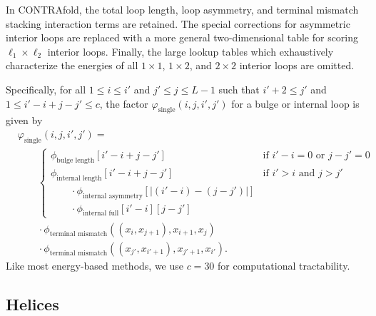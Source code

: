 \documentclass{article}
\newcommand{\internallength}{\phi_\text{internal length}}
\newcommand{\internalfull}{\phi_\text{internal full}}
\newcommand{\internalasymmetry}{\phi_\text{internal asymmetry}}
\newcommand{\mismatch}{\phi_\text{terminal mismatch}}
\newcommand{\single}{\varphi_\text{single}}
\newcommand{\bulgelength}{\phi_\text{bulge length}}
\begin{document}
  In CONTRAfold, the total loop length, loop asymmetry, and terminal mismatch stacking interaction
  terms are retained.  The special corrections for asymmetric interior loops are replaced with a more general
  two-dimensional table for scoring $\ell_1 \times \ell_2$ interior loops.
  Finally, the large lookup tables which exhaustively characterize the energies of 
  all $1 \times 1$, $1 \times 2$, and $2 \times 2$ interior loops are omitted.

  Specifically, for all $1 \le i \le i'$ and $j' \le j \le L-1$ such that $i'+2\le j'$
  and $1 \le i'-i+j-j' \le c$, the factor $\single(i,j,i',j')$ for a bulge or internal loop
  is given by
  \begin{align}
    &\single(i,j,i',j') = \nonumber \\
    &\qquad
    \begin{cases}
      \bulgelength[i'-i+j-j'] & \text{if $i'-i=0$ or $j-j'=0$}  \\
      \internallength[i'-i+j-j'] & \text{if $i'>i$ and $j>j'$} \\
      \qquad{} \cdot \internalasymmetry[|(i'-i)-(j-j')|] \\
      \qquad{} \cdot \internalfull[i'-i][j-j']
    \end{cases} \nonumber \\
    &\qquad {} \cdot \mismatch((x_i,x_{j+1}),x_{i+1},x_j) \nonumber \\
    &\qquad {} \cdot \mismatch((x_{j'},x_{i'+1}),x_{j'+1},x_{i'}). 
  \end{align}
  Like most energy-based methods, we use $c=30$ for computational tractability.
  
  \subsection{Helices}
\end{document}
